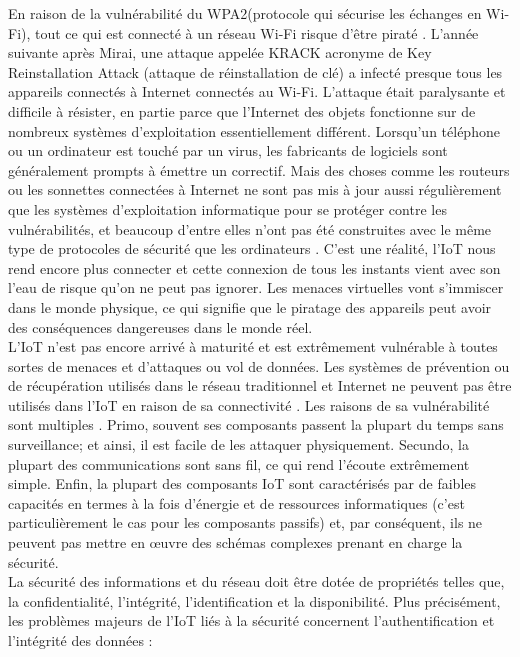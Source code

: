 En raison de la vulnérabilité du WPA2(protocole qui sécurise les échanges en Wi-Fi), tout ce qui est connecté à un réseau Wi-Fi risque d’être piraté \cite{kasperski201krack}. L'année suivante après Mirai, une attaque appelée KRACK acronyme de Key Reinstallation Attack (attaque de réinstallation de clé) a infecté presque tous les appareils connectés à Internet connectés au Wi-Fi. L'attaque était paralysante et dif{\kern0pt}f{\kern0pt}icile à résister, en partie parce que l'Internet des objets fonctionne sur de nombreux systèmes d'exploitation essentiellement dif{\kern0pt}férent. Lorsqu'un téléphone ou un ordinateur est touché par un virus, les fabricants de logiciels sont généralement prompts à émettre un correctif. Mais des choses comme les routeurs ou les sonnettes connectées à Internet ne sont pas mis à jour aussi régulièrement que les systèmes d’exploitation informatique pour se protéger contre les vulnérabilités, et beaucoup d'entre elles n'ont pas été construites avec le même type de protocoles de sécurité que les ordinateurs \cite{pardes2020iot}. C’est une réalité, l’IoT nous rend encore plus connecter et cette connexion de tous les instants vient avec son l’eau de risque qu’on ne peut pas ignorer. Les menaces virtuelles vont s’immiscer dans le monde physique, ce qui signif{\kern0pt}ie que le piratage des appareils peut avoir des conséquences dangereuses dans le monde réel.\\

L'IoT n'est pas encore arrivé à maturité et est extrêmement vulnérable à toutes sortes de menaces et d'attaques ou vol de données. Les systèmes de prévention ou de récupération utilisés dans le réseau traditionnel et Internet ne peuvent pas être utilisés dans l'IoT en raison de sa connectivité \cite{hu2016security}. Les raisons de sa vulnérabilité sont multiples \cite{atzori2010iot}. Primo, souvent ses composants passent la plupart du temps sans surveillance; et ainsi, il est facile de les attaquer physiquement. Secundo, la plupart des communications sont sans f{\kern0pt}il, ce qui rend l'écoute extrêmement simple. Enf{\kern0pt}in, la plupart des composants IoT sont caractérisés par de faibles capacités en termes à la fois d'énergie et de ressources informatiques (c'est particulièrement le cas pour les composants passifs) et, par conséquent, ils ne peuvent pas mettre en œuvre des schémas complexes prenant en charge la sécurité.\\
La sécurité des informations et du réseau doit être dotée de propriétés telles que, la conf{\kern0pt}identialité, l'intégrité, l'identif{\kern0pt}ication et la disponibilité. Plus précisément, les problèmes majeurs de l’IoT liés à la sécurité concernent l'authentif{\kern0pt}ication et l'intégrité des données \cite{atzori2010iot} : \\

